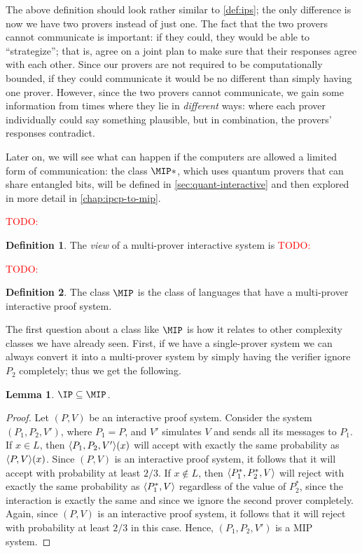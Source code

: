 \documentclass[english,12pt]{reedthesis}
\theoremstyle{plain}
\newtheorem{lemma}[lemma]{Lemma}
\theoremstyle{definition}
\newtheorem{defn}[defn]{Definition}
\theoremstyle{remark}
\DeclarePairedDelimiter{\ang}{\langle}{\rangle}
\newcommand{\TODO}[1]{\textcolor{red}{TODO: #1}}
\begin{document}
The above definition should look rather similar to \cref{def:ips}; the only
difference is now we have two provers instead of just one. The fact that the two
provers cannot communicate is important: if they could, they would be able to
``strategize''; that is, agree on a joint plan to make sure that their responses
agree with each other. Since our provers are not required to be computationally
bounded, if they could communicate it would be no different than simply having
one prover. However, since the two provers cannot communicate, we gain some
information from times where they lie in \emph{different} ways: where each
prover individually could say something plausible, but in combination, the
provers' responses contradict.

Later on, we will see what can happen if the computers are allowed a limited
form of communication: the class $\MIP*$, which uses quantum provers that can
share entangled bits, will be defined in \cref{sec:quant-interactive} and then
explored in more detail in \cref{chap:ipcp-to-mip}.

\TODO{}

\begin{defn}\label{def:view-mip}
  The \emph{view} of a multi-prover interactive system is \TODO{}
\end{defn}

\TODO{}

\begin{defn}\label{def:mip}
  The class $\MIP$ is the class of languages that have a multi-prover
  interactive proof system.
\end{defn}

The first question about a class like $\MIP$ is how it relates to other
complexity classes we have already seen. First, if we have a single-prover
system we can always convert it into a multi-prover system by simply having the
verifier ignore $P_{2}$ completely; thus we get the following.

\begin{lemma}\label{lem:ip-in-mip}
  $\IP \subseteq \MIP$.
\end{lemma}

\begin{proof}
  Let $(P, V)$ be an interactive proof system. Consider the system
  $(P_{1}, P_{2}, V')$, where $P_{1} = P$, and $V'$ simulates $V$ and sends all
  its messages to $P_{1}$. If $x \in L$, then $\ang{P_{1}, P_{2}, V'}(x)$ will
  accept with exactly the same probability as $\ang{P, V}(x)$. Since $(P, V)$ is
  an interactive proof system, it follows that it will accept with probability
  at least $2/3$. If $x \notin L$, then $\ang{P_{1}^{*}, P_{2}^{*}, V}$ will reject
  with exactly the same probability as $\ang{P_{1}^{*}, V}$ regardless of the
  value of $P_{2}^{*}$, since the interaction is exactly the same and since we
  ignore the second prover completely. Again, since $(P, V)$ is an interactive
  proof system, it follows that it will reject with probability at least $2/3$
  in this case. Hence, $(P_{1}, P_{2}, V')$ is a MIP system.
\end{proof}
\end{document}
